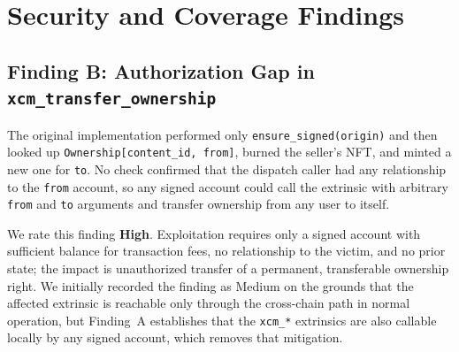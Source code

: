 
\chapter{Security and Coverage Findings}\label{app:security}

\section[Finding B: Authorization Gap]{Finding B: Authorization Gap in \texttt{xcm\_transfer\_ownership}}\label{sec:d-finding-b}

The original implementation performed only \texttt{ensure\_signed(origin)} and then looked up \texttt{Ownership[content\_id, from]}, burned the seller's NFT, and minted a new one for \texttt{to}. No check confirmed that the dispatch caller had any relationship to the \texttt{from} account, so any signed account could call the extrinsic with arbitrary \texttt{from} and \texttt{to} arguments and transfer ownership from any user to itself.

We rate this finding \textbf{High}. Exploitation requires only a signed account with sufficient balance for transaction fees, no relationship to the victim, and no prior state; the impact is unauthorized transfer of a permanent, transferable ownership right. We initially recorded the finding as Medium on the grounds that the affected extrinsic is reachable only through the cross-chain path in normal operation, but Finding~A establishes that the \texttt{xcm\_*} extrinsics are also callable locally by any signed account, which removes that mitigation.

